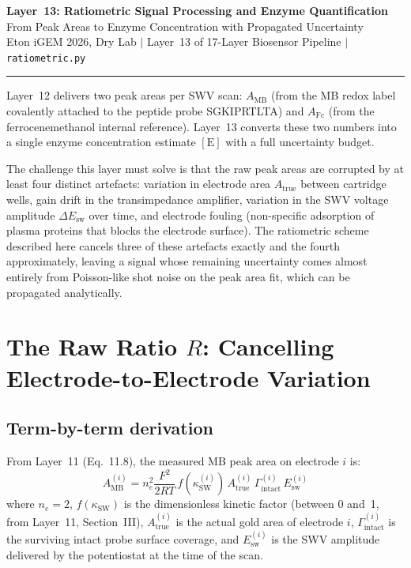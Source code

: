 \documentclass[10pt,a4paper]{article}
\numberwithin{equation}{section}
\newcommand{\Esw}{E_{\text{sw}}}
\newcommand{\AMB}{A_{\text{MB}}}
\newcommand{\AFc}{A_{\text{Fc}}}
\newcommand{\Gtot}{\Gamma_{\text{intact}}}
\begin{document}
\begin{center}
{\LARGE\bfseries Layer~13: Ratiometric Signal Processing and Enzyme Quantification}\\[0.4em]
{\large From Peak Areas to Enzyme Concentration with Propagated Uncertainty}\\[0.25em]
{\small\color{gray} Eton iGEM 2026, Dry Lab \quad$|$\quad
Layer~13 of 17-Layer Biosensor Pipeline \quad$|$\quad
\texttt{ratiometric.py}}
\end{center}
\vspace{0.4em}\hrule\vspace{0.7em}

\noindent
Layer~12 delivers two peak areas per SWV scan: $\AMB$ (from the MB redox
label covalently attached to the peptide probe SGKIPRTLTA) and $\AFc$ (from the
ferrocenemethanol internal reference). Layer~13 converts these two numbers into a
single enzyme concentration estimate $[\text{E}]$ with a full uncertainty budget.

The challenge this layer must solve is that the raw peak areas are corrupted
by at least four distinct artefacts: variation in electrode area $A_\text{true}$
between cartridge wells, gain drift in the transimpedance amplifier,
variation in the SWV voltage amplitude $\Delta E_\text{sw}$ over time, and
electrode fouling (non-specific adsorption of plasma proteins that blocks
the electrode surface). The ratiometric scheme described here cancels three
of these artefacts exactly and the fourth approximately, leaving a signal
whose remaining uncertainty comes almost entirely from Poisson-like shot
noise on the peak area fit, which can be propagated analytically.

\section{The Raw Ratio $R$: Cancelling Electrode-to-Electrode Variation}
\label{sec:ratio}

\subsection{Term-by-term derivation}

From Layer~11 (Eq.~11.8), the measured MB peak area on electrode $i$ is:
\begin{equation}
  \AMB^{(i)} = n_e^2 \frac{F^2}{2RT}\,f(\kappa_{\text{SW}}^{(i)})\,
  A_\text{true}^{(i)}\,\Gtot^{(i)}\,\Esw^{(i)}
  \label{eq:AMB}
\end{equation}
where $n_e = 2$, $f(\kappa_\text{SW})$ is the dimensionless kinetic factor
(between 0 and~1, from Layer~11, Section~III), $A_\text{true}^{(i)}$ is the
actual gold area of electrode $i$, $\Gtot^{(i)}$ is the surviving intact
probe surface coverage, and $\Esw^{(i)}$ is the SWV amplitude delivered
by the potentiostat at the time of the scan.
\end{document}
